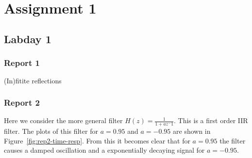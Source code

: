 \documentclass[11pt,titlepage]{report}
\begin{document}
\chapter{Assignment 1}
\section{Labday 1}
\subsection{Report 1}
(In)fitite reflections

\subsection{Report 2}
Here we consider the more general filter $H(z) = \frac{1}{1+az^-1}$.  This is a first order IIR filter. The plots of this filter for $a=0.95$ and $a=-0.95$ are shown in Figure~\ref{fig:rep2-time-resp}. From this it becomes clear that for $a=0.95$ the filter causes a damped oscillation and a exponentially decaying signal for $a=-0.95$. \\
\end{document}
